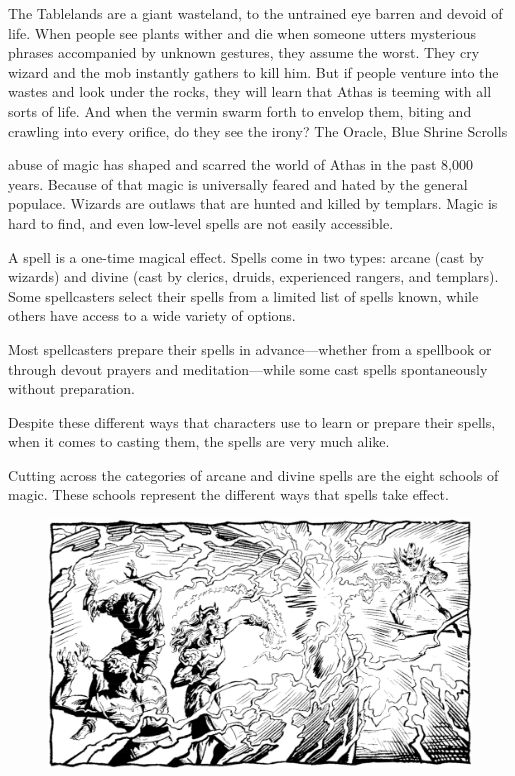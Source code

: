 {The Tablelands are a giant wasteland, to the untrained eye barren and devoid of life. When people see plants wither and die when someone utters mysterious phrases accompanied by unknown gestures, they assume the worst. They cry wizard and the mob instantly gathers to kill him. But if people venture into the wastes and look under the rocks, they will learn that Athas is teeming with all sorts of life. And when the vermin swarm forth to envelop them, biting and crawling into every orifice, do they see the irony?}
{The Oracle, Blue Shrine Scrolls}

 abuse of magic has shaped and scarred the world of Athas in the past 8,000 years. Because of that magic is universally feared and hated by the general populace. Wizards are outlaws that are hunted and killed by templars. Magic is hard to find, and even low-level spells are not easily accessible.

A spell is a one-time magical effect. Spells come in two types: arcane (cast by wizards) and divine (cast by clerics, druids, experienced rangers, and templars). Some spellcasters select their spells from a limited list of spells known, while others have access to a wide variety of options.

Most spellcasters prepare their spells in advance---whether from a spellbook or through devout prayers and meditation---while some cast spells spontaneously without preparation.

Despite these different ways that characters use to learn or prepare their spells, when it comes to casting them, the spells are very much alike.

Cutting across the categories of arcane and divine spells are the eight schools of magic. These schools represent the different ways that spells take effect.

\begin{figure}[t!]
\centering
\includegraphics[width=\textwidth]{images/magic-1.png}
\WOTC
\end{figure}

